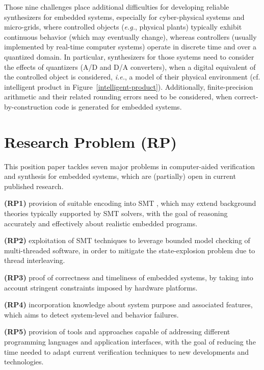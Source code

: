 \documentclass[format=acmsmall, review=false, screen=true]{acmart}
\begin{document}
Those nine challenges place additional difficulties for developing reliable synthesizers for embedded systems, especially for cyber-physical systems and micro-grids, where controlled objects ({\it e.g.}, physical plants) typically exhibit continuous behavior (which may eventually change), whereas controllers (usually implemented by real-time computer systems) operate in discrete time and over a quantized domain. In particular, synthesizers for those systems need to consider the effects of quantizers (A/D and D/A converters), when a digital equivalent of the controlled object is considered, {\it i.e.}, a model of their physical environment (cf. intelligent product in Figure~\ref{intelligent-product}). Additionally,  finite-precision arithmetic and their related rounding errors need to be considered, when correct-by-construction code is generated for embedded systems.

\section{Research Problem (RP)}
\label{Research-Problem}

This position paper tackles seven major problems in computer-aided verification and synthesis for embedded systems, which are (partially) open in current published research.

\textbf{(RP1)} provision of suitable encoding into SMT \cite{BarrettSST09}, which may extend background theories typically supported by SMT solvers, with the goal of reasoning accurately and effectively about realistic embedded programs.

\textbf{(RP2)} exploitation of SMT techniques to leverage bounded model checking of multi-threaded software, in order to mitigate the state-explosion problem due to thread interleaving.
	
\textbf{(RP3)} proof of correctness and timeliness of embedded systems, by taking into account stringent constraints imposed by hardware platforms.
	
\textbf{(RP4)} incorporation knowledge about system purpose and associated features, which aims to detect system-level and behavior failures.

\textbf{(RP5)} provision of tools and approaches capable of addressing different programming languages and application interfaces, with the goal of reducing the time needed to adapt current verification techniques to new developments and technologies.
\end{document}
